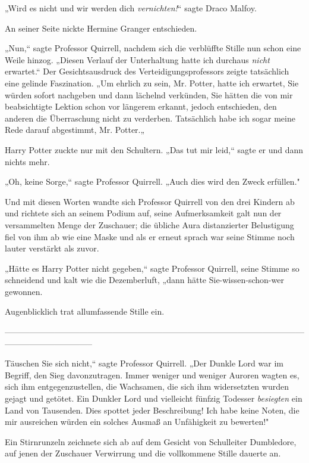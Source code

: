 {„Wird es nicht und wir werden dich \emph{vernichten!}“ sagte Draco Malfoy.

An seiner Seite nickte Hermine Granger entschieden.

„Nun,“ sagte Professor Quirrell, nachdem sich die verblüffte Stille nun schon eine Weile hinzog. „Diesen Verlauf der Unterhaltung hatte ich durchaus \emph{nicht} erwartet.“ Der Gesichtsausdruck des Verteidigungsprofessors zeigte tatsächlich eine gelinde Faszination. „Um ehrlich zu sein, Mr. Potter, hatte ich erwartet, Sie würden sofort nachgeben und dann lächelnd verkünden, Sie hätten die von mir beabsichtigte Lektion schon vor längerem erkannt, jedoch entschieden, den anderen die Überraschung nicht zu verderben. Tatsächlich habe ich sogar meine Rede darauf abgestimmt, Mr. Potter.„

Harry Potter zuckte nur mit den Schultern. „Das tut mir leid,“ sagte er und dann nichts mehr.

„Oh, keine Sorge,“ sagte Professor Quirrell. „Auch dies wird den Zweck erfüllen."

Und mit diesen Worten wandte sich Professor Quirrell von den drei Kindern ab und richtete sich an seinem Podium auf, seine Aufmerksamkeit galt nun der versammelten Menge der Zuschauer; die übliche Aura distanzierter Belustigung fiel von ihm ab wie eine Maske und als er erneut sprach war seine Stimme noch lauter verstärkt als zuvor.

„Hätte es Harry Potter nicht gegeben,“ sagte Professor Quirrell, seine Stimme so schneidend und kalt wie die Dezemberluft, „dann hätte Sie-wissen-schon-wer gewonnen.

Augenblicklich trat allumfassende Stille ein.

--------------------------------------------------------------------------------------------------------------------------------------------

\hfill\break Täuschen Sie sich nicht,“ sagte Professor Quirrell. „Der Dunkle Lord war im Begriff, den Sieg davonzutragen. Immer weniger und weniger Auroren wagten es, sich ihm entgegenzustellen, die Wachsamen, die sich ihm widersetzten wurden gejagt und getötet. Ein Dunkler Lord und vielleicht fünfzig Todesser \emph{besiegten} ein Land von Tausenden. Dies spottet jeder Beschreibung! Ich habe keine Noten, die mir ausreichen würden ein solches Ausmaß an Unfähigkeit zu bewerten!"

Ein Stirnrunzeln zeichnete sich ab auf dem Gesicht von Schulleiter Dumbledore, auf jenen der Zuschauer Verwirrung und die vollkommene Stille dauerte an.

}
